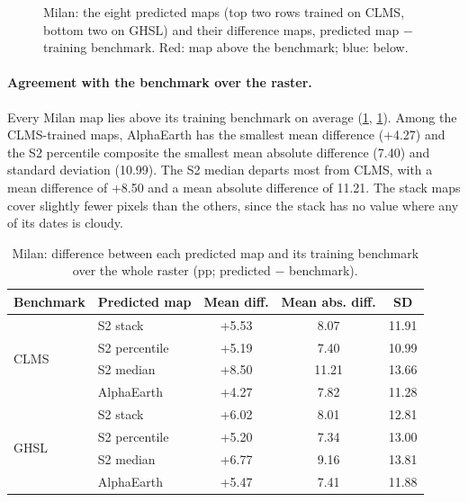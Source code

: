 \begin{figure}[htbp]
  \centering
  \caption{Milan: the eight predicted maps (top two rows trained on CLMS,
  bottom two on GHSL) and their difference maps, predicted map $-$ training
  benchmark. Red: map above the benchmark; blue: below.}
  \label{fig:milan-maps}
\end{figure}

\paragraph{Agreement with the benchmark over the raster.} Every Milan map lies
above its training benchmark on average (\cref{fig:milan-maps},
\cref{tab:milan-diff}). Among the CLMS-trained maps, AlphaEarth has the
smallest mean difference (+4.27\pp) and the S2 percentile composite the
smallest mean absolute difference (7.40\pp) and standard deviation
(10.99\pp). The S2 median departs most from CLMS, with a mean difference of
+8.50\pp{} and a mean absolute difference of 11.21\pp. The stack maps cover
slightly fewer pixels than the others, since the stack has no value where any
of its dates is cloudy.

\begin{table}[htbp]
  \centering
  \small
  \caption{Milan: difference between each predicted map and its training
  benchmark over the whole raster (pp; predicted $-$ benchmark).}
  \label{tab:milan-diff}
  \begin{tabular}{llccc}
    \toprule
    Benchmark & Predicted map & Mean diff. & Mean abs. diff. & SD \\
    \midrule
    \multirow{4}{*}{CLMS}
      & S2 stack      & +5.53 & 8.07 & 11.91 \\
      & S2 percentile & +5.19 & 7.40 & 10.99 \\
      & S2 median     & +8.50 & 11.21 & 13.66 \\
      & AlphaEarth    & +4.27 & 7.82 & 11.28 \\
    \midrule
    \multirow{4}{*}{GHSL}
      & S2 stack      & +6.02 & 8.01 & 12.81 \\
      & S2 percentile & +5.20 & 7.34 & 13.00 \\
      & S2 median     & +6.77 & 9.16 & 13.81 \\
      & AlphaEarth    & +5.47 & 7.41 & 11.88 \\
    \bottomrule
  \end{tabular}
\end{table}

